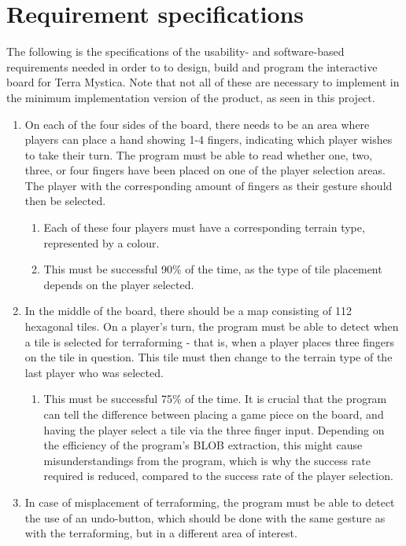 \section{Requirement specifications}\label{sec:ReqSpec}
The following is the specifications of the usability- and software-based requirements needed in order to to design, build and program the interactive board for Terra Mystica. Note that not all of these are necessary to implement in the minimum implementation version of the product, as seen in this project. 

\begin{enumerate}
\item On each of the four sides of the board, there needs to be an area where players can place a hand showing 1-4 fingers, indicating which player wishes to take their turn. The program must be able to read whether one, two, three, or four fingers have been placed on one of the player selection areas. The player with the corresponding amount of fingers as their gesture should then be selected.
	\begin{enumerate}
	\item Each of these four players must have a corresponding terrain type, represented by a colour.
	\item This must be successful 90\% of the time, as the type of tile placement depends on the player selected.
	\end{enumerate}
\item In the middle of the board, there should be a map consisting of 112 hexagonal tiles. On a player's turn, the program must be able to detect when a tile is selected for terraforming - that is, when a player places three fingers on the tile in question. This tile must then change to the terrain type of the last player who was selected.
	\begin{enumerate}
	\item This must be successful 75\% of the time. It is crucial that the program can tell the difference between placing a game piece on the board, and having the player select a tile via the three finger input. Depending on the efficiency of the program’s BLOB extraction, this might cause misunderstandings from the program, which is why the success rate required is reduced, compared to the success rate of the player selection.
	\end{enumerate}
\item In case of misplacement of terraforming, the program must be able to detect the use of an undo-button, which should be done with the same gesture as with the terraforming, but in a different area of interest.

\end{enumerate}
